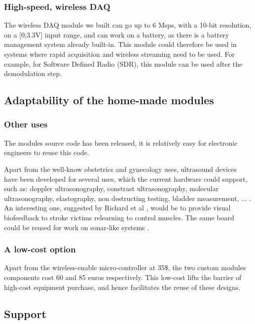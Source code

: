 \documentclass[letterpaper, 10 pt, conference]{ieeeconf} %
\begin{document}
\subsubsection{High-speed, wireless DAQ}

The wireless DAQ module we built can go up to 6 Msps, with a 10-bit resolution, on a [0;3.3V] input range, and can work on a battery, as there is a battery management system already built-in. This module could therefore be used in systems where rapid acquisition and wireless streaming need to be used. For example, for Software Defined Radio (SDR), this module can be used after the demodulation step.

\subsection{Adaptability of the home-made modules}

\subsubsection{Other uses}

The modules source code has been released, it is relatively easy for electronic engineers to reuse this code. 

Apart from the well-know obstetrics and gynecology uses, ultrasound devices have been developed for several uses, which the current hardware could support, such as: doppler ultrasonography, constrast ultrasonography, molecular ultrasonography, elastography, non destructing testing, bladder measurement, ... . An interesting one, suggested by Richard et al \cite{c3}, would be to provide visual biofeedback to stroke victims relearning to control muscles. The same board could be reused for work on sonar-like systems \cite{c14}.

\subsubsection{A low-cost option}

Apart from the wireless-enable micro-controller at 35\$, the two custom modules components cost 60 and 85 euros respectively. This low-cost lifts the barrier of high-cost equipment purchase, and hence facilitates the reuse of these designs.

\subsection{Support} 
\end{document}
